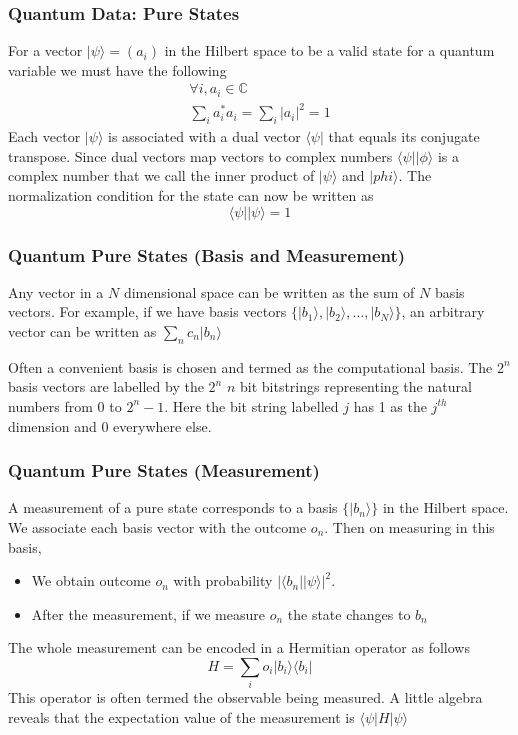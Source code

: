 \documentclass{beamer}
\newcommand{\bra}[1]{\langle #1 \vert}
\newcommand{\ket}[1]{\vert #1 \rangle}
\begin{document}
\begin{frame}
  \frametitle{Quantum Data: Pure States}
For a vector $\ket{\psi} = (a_i)$ in the Hilbert space to be a valid state for a quantum variable we must have the following
\begin{align}
  \forall i, a_i \in \mathbb{C} \\
  \sum _i a_i^{\ast}a_i = \sum_i |a_i|^2 = 1
\end{align}
Each vector $\ket{\psi}$ is associated with a dual vector $\bra{\psi}$ that equals its conjugate transpose. Since dual vectors map vectors to complex numbers $\bra{\psi}\ket{\phi}$ is a complex number that we call the inner product of $\ket{\psi}$ and $\ket{phi}$. The normalization condition for the state can now be written as
\[
  \bra{\psi}\ket{\psi} = 1
\]
\end{frame}

\begin{frame}
  \frametitle{Quantum Pure States (Basis and Measurement)}
  Any vector in a $N$ dimensional space can be written as the sum of $N$ basis vectors. For example, if we have basis vectors $\{\ket{b_1},\ket{b_2},\dots,\ket{b_N}\}$, an arbitrary vector can be written as
  $
  \sum\limits_n c_n\ket{b_n}
  $

  Often a convenient basis is chosen and termed as the computational basis. The $2^n$ basis vectors are labelled by the $2^n$ $n$ bit bitstrings representing the natural numbers from $0$ to $2^n-1$. Here the bit string labelled $j$ has 1 as the $j^{th}$ dimension and 0 everywhere else.
\end{frame}

\begin{frame}
  \frametitle{Quantum Pure States (Measurement)}
  A measurement of a pure state corresponds to a basis $\{\ket{b_n}\}$ in the Hilbert space. We associate each basis vector with the outcome $o_n$. Then on measuring in this basis,
  \begin{itemize}
  \item We obtain outcome $o_n$ with probability $|\bra{b_n}\ket{\psi}|^2$.
    
  \item After the measurement, if we measure $o_n$ the state changes to $b_n$
  \end{itemize}
  The whole measurement can be encoded in a Hermitian operator as follows
  \[
    H = \sum_i o_i \ket{b_i}\bra{b_i}
  \]
  This operator is often termed the observable being measured. A little algebra reveals that the expectation value of the measurement is $\bra{\psi}H\ket{\psi}$
\end{frame}
\end{document}
